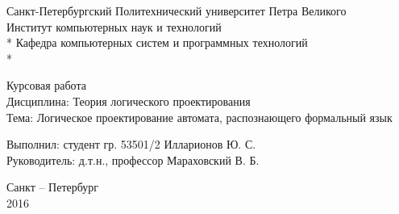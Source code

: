 \documentclass[a4paper,14pt,russian]{extarticle} %
\begin{document}
	
\begin{titlepage}
\newpage

\begin{center}
 Санкт-Петербургский Политехнический университет Петра Великого \\
 Институт компьютерных наук и технологий \\*
 Кафедра компьютерных систем и программных технологий \\*
\end{center}

\vspace{15em}

\begin{center}
\large
Курсовая работа \\ 
Дисциплина: Теория логического проектирования \\
Тема: Логическое проектирование автомата, распознающего формальный язык
\end{center}

\vspace{2em}

\begin{flushleft}
\hspace{2em}	
Выполнил: студент гр. 53501/2 \hfill 
Илларионов Ю. С.  
\hrulefill 	\\
\vspace{1.5em}
\hspace{2em} Руководитель: д.т.н., профессор \hfill 
Мараховский В. Б.
\hrulefill 	\\
\end{flushleft}

\vspace{\fill}

\begin{center}
Санкт – Петербург \\
2016
\end{center}

\end{titlepage}
\end{document}
